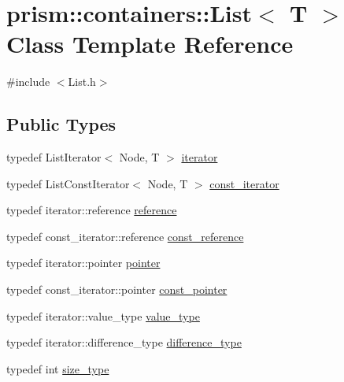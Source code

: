 \hypertarget{classprism_1_1containers_1_1_list}{}\section{prism\+:\+:containers\+:\+:List$<$ T $>$ Class Template Reference}
\label{classprism_1_1containers_1_1_list}


{\ttfamily \#include $<$List.\+h$>$}

\subsection*{Public Types}
\begin{DoxyCompactItemize}
\item 
typedef List\+Iterator$<$ Node, T $>$ \hyperlink{classprism_1_1containers_1_1_list_af3a4f72e9b96d080fe64d1803c91c7f8}{iterator}
\item 
typedef List\+Const\+Iterator$<$ Node, T $>$ \hyperlink{classprism_1_1containers_1_1_list_ab7a3833614e0dbdcc666829f86efa5e2}{const\+\_\+iterator}
\item 
typedef iterator\+::reference \hyperlink{classprism_1_1containers_1_1_list_ae7c9f99dba5936d744397455c97aacde}{reference}
\item 
typedef const\+\_\+iterator\+::reference \hyperlink{classprism_1_1containers_1_1_list_a7c1ae893be7215e14e183c0e3652e1b5}{const\+\_\+reference}
\item 
typedef iterator\+::pointer \hyperlink{classprism_1_1containers_1_1_list_a93454816d3759016ad6736a21fc1892c}{pointer}
\item 
typedef const\+\_\+iterator\+::pointer \hyperlink{classprism_1_1containers_1_1_list_a9d28e5cd275b4bb9afe1f5b3ddb90fed}{const\+\_\+pointer}
\item 
typedef iterator\+::value\+\_\+type \hyperlink{classprism_1_1containers_1_1_list_ab1d5e3904b183e4e450f21d8fdffa31e}{value\+\_\+type}
\item 
typedef iterator\+::difference\+\_\+type \hyperlink{classprism_1_1containers_1_1_list_a27674a278c68d3f0242fc13b87cdf0f0}{difference\+\_\+type}
\item 
typedef int \hyperlink{classprism_1_1containers_1_1_list_a13996f935ad746b4eef16686ade28f35}{size\+\_\+type}
\end{DoxyCompactItemize}
